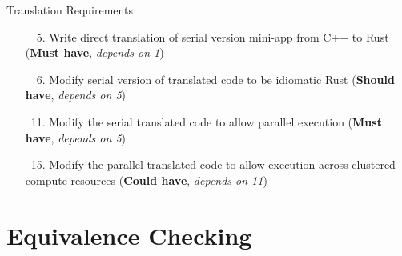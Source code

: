 \documentclass[10pt,aspectratio=169]{beamer}
\newcommand{\cmark}{\ding{51}}
\newcommand{\done}{\rlap{$\square$}{\raisebox{2pt}{\large\hspace{1pt}\textcolor{green}{\cmark}}}\hspace{-2.5pt}}
\begin{document}
\begin{frame}{Translation Requirements}
    \begin{itemize}
        \item[\done\ \ 5.]
          Write direct translation of serial version mini-app from C++ to Rust
          (\textbf{Must have}, \textit{depends on 1})
        \item[\done\ \ 6.]
          Modify serial version of translated code to be idiomatic Rust \cite{endlerMreIdiomaticrust2023} 
          (\textbf{Should have}, \textit{depends on 5})
        \item[\done\ 11.]
          Modify the serial translated code to allow parallel execution
          (\textbf{Must have}, \textit{depends on 5})
        \item[\done\ 15.]
          Modify the parallel translated code to allow execution across clustered compute resources
          (\textbf{Could have}, \textit{depends on 11})
    \end{itemize}
\end{frame}




\section{Equivalence Checking}
\end{document}
